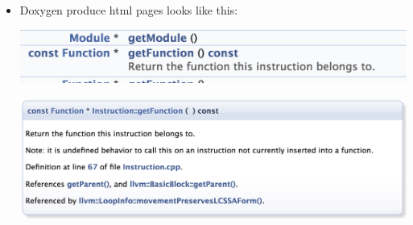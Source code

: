 \documentclass[a4paper,11pt,twoside]{book}
\begin{document}
\begin{itemize}
	\item Doxygen produce html pages looks like this:
	
\begin{center}

	\includegraphics[scale=0.45]{pics/dox1.png}  \medskip
	
	\includegraphics[scale=0.45]{pics/dox2.png} 

\end{center}

\end{itemize}
\end{document}
